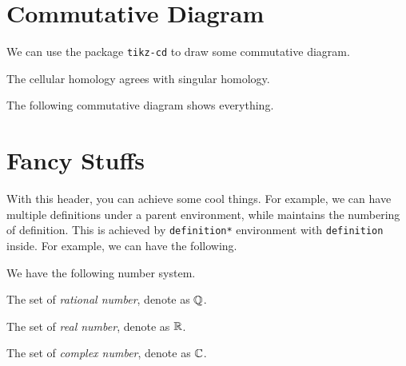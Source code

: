 \section{Commutative Diagram}
We can use the package \texttt{tikz-cd} to draw some commutative diagram.
\begin{eg}
	The cellular homology agrees with singular homology.
\end{eg}
\begin{explanation}
	The following commutative diagram shows everything.
	\par
\end{explanation}

\section{Fancy Stuffs}
With this header, you can achieve some cool things. For example, we can have multiple definitions under a parent environment, while maintains the numbering of definition. This is achieved by \texttt{definition*} environment with \texttt{definition} inside. For example, we can have the following.
\begin{definition*}
	We have the following number system.
	\begin{definition}\label{def:rational}
		The set of \emph{rational number}, denote as \(\mathbb{\MakeUppercase{q}} \).
	\end{definition}
	\begin{definition}\label{def:real}
		The set of \emph{real number}, denote as \(\mathbb{\MakeUppercase{r}} \).
	\end{definition}
	\begin{definition}\label{def:complex}
		The set of \emph{complex number}, denote as \(\mathbb{\MakeUppercase{c}} \).
	\end{definition}
\end{definition*}

